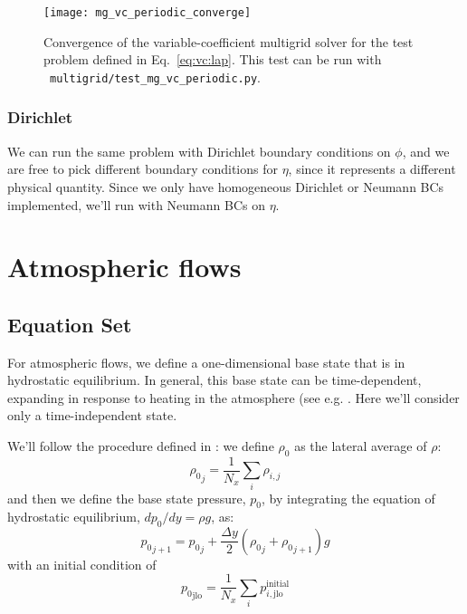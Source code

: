\begin{figure}[t]
\centering
\texttt{[image: mg\_vc\_periodic\_converge]}
\caption[Convergence of the variable-coefficient Poisson solver]{\label{fig:mg_vc_converge} Convergence of the variable-coefficient
multigrid solver for the test problem defined in Eq.~\ref{eq:vc:lap}.  This test can be
run with \pyro\ {\tt multigrid/test\_mg\_vc\_periodic.py}.}
\end{figure}

\subsubsection{Dirichlet}

We can run the same problem with Dirichlet boundary conditions on $\phi$,
and we are free to pick different boundary conditions for $\eta$, since
it represents a different physical quantity.  Since we only have homogeneous
Dirichlet or Neumann BCs implemented, we'll run with Neumann BCs on $\eta$.



\section{Atmospheric flows}
\label{sec:lm:atm} 

\subsection{Equation Set}

For atmospheric flows, we define a one-dimensional base state that is
in hydrostatic equilibrium.  In general, this base state can be
time-dependent, expanding in response to heating in the atmosphere
(see e.g. \cite{almgren:2000,ABRZ:II}.  Here we'll consider only a
time-independent state.

We'll follow the procedure defined in \cite{multilevel}: we define
$\rho_0$ as the lateral average of $\rho$:
\begin{equation}
{\rho_0}_j = \frac{1}{N_x} \sum_i \rho_{i,j}
\end{equation}
and then we define the base state pressure, $p_0$, by integrating the
equation of hydrostatic equilibrium, $dp_0/dy = \rho g$, as:
\begin{equation}
{p_0}_{j+1} = {p_0}_j + \frac{\Delta y}{2} ({\rho_0}_j + {\rho_0}_{j+1}) g
\end{equation}
with an initial condition of 
\begin{equation}
{p_0}_\mathrm{jlo} = \frac{1}{N_x} \sum_{i} p^\mathrm{initial}_{i,\mathrm{jlo}}
\end{equation}

